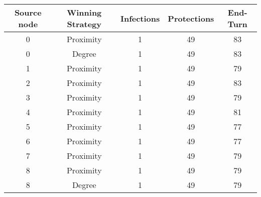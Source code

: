 \documentclass[results.tex]{subfiles}
\begin{document}
    \begin{center}
        \begin{tabular}{| c || c | c | c | c |}
            \hline
            {\bfseries Source node} & {\bfseries Winning Strategy} & {\bfseries Infections} & {\bfseries Protections}
            & {\bfseries End-Turn}
            \\  %
            \hline\hline
            0                       & Proximity                    & 1                      & 49                      & 83                   \\
            \hline
            0                       & Degree                       & 1                      & 49                      & 83                   \\
            \hline
            1                       & Proximity                    & 1                      & 49                      & 79                   \\
            \hline
            2                       & Proximity                    & 1                      & 49                      & 83                   \\
            \hline
            3                       & Proximity                    & 1                      & 49                      & 79                   \\
            \hline
            4                       & Proximity                    & 1                      & 49                      & 81                   \\
            \hline
            5                       & Proximity                    & 1                      & 49                      & 77                   \\
            \hline
            6                       & Proximity                    & 1                      & 49                      & 77                   \\
            \hline
            7                       & Proximity                    & 1                      & 49                      & 79                   \\
            \hline
            8                       & Proximity                    & 1                      & 49                      & 79                   \\
            \hline
            8                       & Degree                       & 1                      & 49                      & 79                   \\

\end{tabular}
\end{center}
\end{document}
